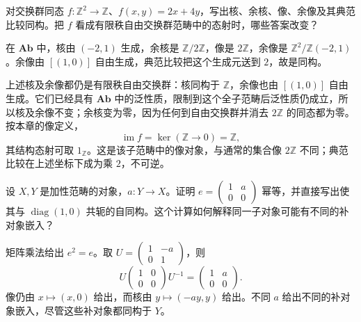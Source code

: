 \begin{exercise}\label{b4:ex:04-image-comparison}
	对交换群同态 \(f:\mathbb Z^2\to\mathbb Z\)、\(f(x,y)=2x+4y\)，写出核、余核、像、余像及其典范比较同构。把 \(f\) 看成有限秩自由交换群范畴中的态射时，哪些答案改变？
\end{exercise}
\begin{solution}
	在 \(\mathbf{Ab}\) 中，核由 \((-2,1)\) 生成，余核是 \(\mathbb Z/2\mathbb Z\)，像是 \(2\mathbb Z\)，余像是 \(\mathbb Z^2/\mathbb Z(-2,1)\)。余像由 \([(1,0)]\) 自由生成，典范比较把这个生成元送到 \(2\)，故是同构。

	上述核及余像都仍是有限秩自由交换群：核同构于 \(\mathbb Z\)，余像也由 \([(1,0)]\) 自由生成。它们已经具有 \(\mathbf{Ab}\) 中的泛性质，限制到这个全子范畴后泛性质仍成立，所以核及余像不变；余核变为零，因为任何到自由交换群并消去 \(2\mathbb Z\) 的同态都为零。按本章的像定义，
	\[
		\operatorname{im}f=\ker(\mathbb Z\longrightarrow0)=\mathbb Z,
	\]
	其结构态射可取 \(1_{\mathbb Z}\)。这是该子范畴中的像对象，与通常的集合像 \(2\mathbb Z\) 不同；典范比较在上述坐标下成为乘 \(2\)，不可逆。
\end{solution}

\begin{exercise}\label{b4:ex:04-projection-complements}
	设 \(X,Y\) 是加性范畴的对象，\(a:Y\to X\)。证明 \(e=\begin{pmatrix}1&a\\0&0\end{pmatrix}\) 幂等，并直接写出使其与 \(\operatorname{diag}(1,0)\) 共轭的自同构。这个计算如何解释同一子对象可能有不同的补对象嵌入？
\end{exercise}
\begin{solution}
	矩阵乘法给出 \(e^2=e\)。取 \(U=\begin{pmatrix}1&-a\\0&1\end{pmatrix}\)，则
	\[
		U\begin{pmatrix}1&0\\0&0\end{pmatrix}U^{-1}
		=\begin{pmatrix}1&a\\0&0\end{pmatrix}.
	\]
	像仍由 \(x\mapsto(x,0)\) 给出，而核由 \(y\mapsto(-ay,y)\) 给出。不同 \(a\) 给出不同的补对象嵌入，尽管这些补对象都同构于 \(Y\)。
\end{solution}


